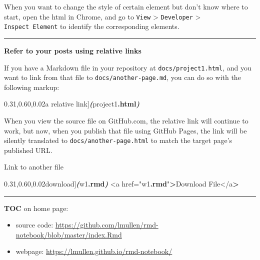 \documentclass[
  a4paper,
  twoside,
  openright]{book}
\newenvironment{Shaded}{\begin{snugshade}}{\end{snugshade}}
\newcommand{\ExtensionTok}[1]{#1}
\newcommand{\FunctionTok}[1]{\textcolor[rgb]{0.13,0.29,0.53}{\textbf{#1}}}
\newcommand{\InformationTok}[1]{\textcolor[rgb]{0.56,0.35,0.01}{\textbf{\textit{#1}}}}
\newcommand{\NormalTok}[1]{#1}
\newcommand{\OperatorTok}[1]{\textcolor[rgb]{0.81,0.36,0.00}{\textbf{#1}}}
\newcommand{\SpecialStringTok}[1]{\textcolor[rgb]{0.31,0.60,0.02}{#1}}
\providecommand{\tightlist}{%
  \setlength{\itemsep}{0pt}\setlength{\parskip}{0pt}}
\theoremstyle{definition}
\theoremstyle{definition}
\theoremstyle{definition}
\theoremstyle{definition}
\theoremstyle{remark}
\begin{document}
When you want to change the style of certain element but don't know where to start, open the html in Chrome, and go to \texttt{View} \textgreater{} \texttt{Developer} \textgreater{} \texttt{Inspect\ Element} to identify the corresponding elements.

\begin{center}\rule{0.5\linewidth}{0.5pt}\end{center}

\textbf{Refer to your posts using relative links}

If you have a Markdown file in your repository at \texttt{docs/project1.html}, and you want to link from that file to \texttt{docs/another-page.md}, you can do so with the following markup:

\begin{Shaded}
\begin{Highlighting}[]
\ExtensionTok{[}\SpecialStringTok{a relative link}\ExtensionTok{]}\InformationTok{(}\NormalTok{project1}\FunctionTok{.html}\InformationTok{)}
\end{Highlighting}
\end{Shaded}

When you view the source file on GitHub.com, the relative link will continue to work, but now, when you publish that file using GitHub Pages, the link will be silently translated to \texttt{docs/another-page.html} to match the target page's published URL.

Link to another file

\begin{Shaded}
\begin{Highlighting}[]
\ExtensionTok{[}\SpecialStringTok{download}\ExtensionTok{]}\InformationTok{(}\NormalTok{w1}\FunctionTok{.rmd}\InformationTok{)}
\NormalTok{\textless{}a href="w1}\FunctionTok{.rmd}\NormalTok{"}\OperatorTok{\textgreater{}}\NormalTok{Download File\textless{}/a}\OperatorTok{\textgreater{}}
\end{Highlighting}
\end{Shaded}

\begin{center}\rule{0.5\linewidth}{0.5pt}\end{center}

\textbf{TOC} on home page:

\begin{itemize}
\tightlist
\item
  source code: \url{https://github.com/lmullen/rmd-notebook/blob/master/index.Rmd}
\item
  webpage: \url{https://lmullen.github.io/rmd-notebook/}
\end{itemize}
\end{document}
